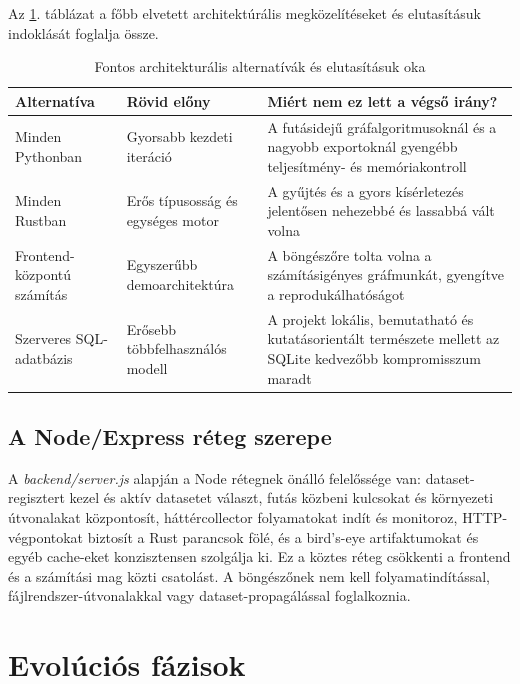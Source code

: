Az \ref{tab:ext-rejected-approaches}. táblázat a főbb elvetett architektúrális megközelítéseket és elutasításuk indoklását foglalja össze.

\begin{table}[H]
\centering
\caption{Fontos architekturális alternatívák és elutasításuk oka}
\label{tab:ext-rejected-approaches}
\begin{tabularx}{\textwidth}{>{\raggedright\arraybackslash}p{3.5cm} >{\raggedright\arraybackslash}p{3.6cm} X}
\toprule
\textbf{Alternatíva} & \textbf{Rövid előny} & \textbf{Miért nem ez lett a végső irány?} \\
\midrule
Minden Pythonban & Gyorsabb kezdeti iteráció & A futásidejű gráfalgoritmusoknál és a nagyobb exportoknál gyengébb teljesítmény- és memóriakontroll \\
Minden Rustban & Erős típusosság és egységes motor & A gyűjtés és a gyors kísérletezés jelentősen nehezebbé és lassabbá vált volna \\
Frontend-központú számítás & Egyszerűbb demoarchitektúra & A böngészőre tolta volna a számításigényes gráfmunkát, gyengítve a reprodukálhatóságot \\
Szerveres SQL-adatbázis & Erősebb többfelhasználós modell & A projekt lokális, bemutatható és kutatásorientált természete mellett az SQLite kedvezőbb kompromisszum maradt \\
\bottomrule
\end{tabularx}
\end{table}

\subsection{A Node/Express réteg szerepe}

A \textit{backend/server.js} alapján a Node rétegnek önálló felelőssége van: dataset-regisztert kezel és aktív datasetet választ, futás közbeni kulcsokat és környezeti útvonalakat központosít, háttércollector folyamatokat indít és monitoroz, HTTP-végpontokat biztosít a Rust parancsok fölé, és a bird's-eye artifaktumokat és egyéb cache-eket konzisztensen szolgálja ki. Ez a köztes réteg csökkenti a frontend és a számítási mag közti csatolást. A böngészőnek nem kell folyamatindítással, fájlrendszer-útvonalakkal vagy dataset-propagálással foglalkoznia.

\section{Evolúciós fázisok}

